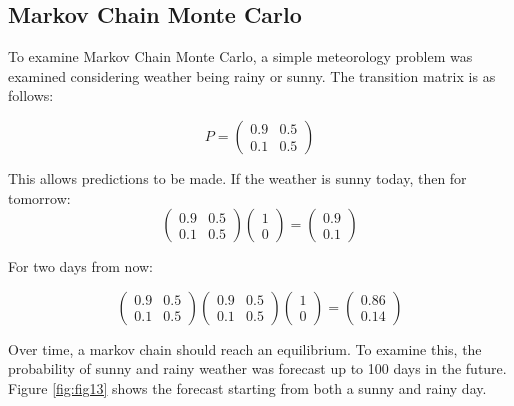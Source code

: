 \documentclass[twocolumn]{article}
\begin{document}
\subsection{Markov Chain Monte Carlo}
To examine Markov Chain Monte Carlo, a simple meteorology problem was examined considering weather being rainy or sunny. The transition matrix is as follows:

\[ P = \begin{pmatrix}
	0.9 & 0.5 \\
	0.1 & 0.5
\end{pmatrix} \]

This allows predictions to be made. If the weather is sunny today, then for tomorrow:
\[ 
\begin{pmatrix} 0.9 & 0.5 \\ 0.1 & 0.5 \end{pmatrix} \begin{pmatrix} 1 \\ 0\end{pmatrix}
= \begin{pmatrix}0.9 \\ 0.1 \end{pmatrix}
\]

For two days from now:

\[
\begin{pmatrix} 0.9 & 0.5 \\ 0.1 & 0.5 \end{pmatrix} \begin{pmatrix} 0.9 & 0.5 \\ 0.1 & 0.5 \end{pmatrix} \begin{pmatrix} 1 \\ 0\end{pmatrix}
=
\begin{pmatrix} 0.86 \\ 0.14\end{pmatrix}
\]

Over time, a markov chain should reach an equilibrium. To examine this, the probability of sunny and rainy weather was forecast up to 100 days in the future. Figure \ref{fig:fig13} shows the forecast starting from both a sunny and rainy day.
\end{document}
